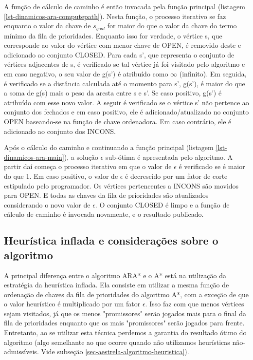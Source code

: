 A função de cálculo de caminho é então invocada pela função principal (listagem \ref{lst-dinamicos-ara-computepath}). Nesta função, o processo iterativo se faz enquanto o valor da chave de $s_{goal}$ for maior do que o valor da chave do termo mínimo da fila de prioridades. Enquanto isso for verdade, o vértice s, que corresponde ao valor do vértice com menor chave de OPEN, é removido deste e adicionado ao conjunto CLOSED. Para cada s', que representa o conjunto de vértices adjacentes de s, é verificado se tal vértice já foi visitado pelo algoritmo e em caso negativo, o seu valor de g(s') é atribuído como $\infty$ (infinito). Em seguida, é verificado se a distância calculada até o momento para s', g(s'), é maior do que a soma de g(s) mais o peso da aresta entre s e s'. Se caso positivo, g(s') é atribuído com esse novo valor. A seguir é verificado se o vértice s' não pertence ao conjunto dos fechados e em caso positivo, ele é adicionado/atualizado no conjunto OPEN baseando-se na função de chave ordenadora. Em caso contrário, ele é adicionado ao conjunto dos INCONS.

Após o cálculo do caminho e continuando a função principal (listagem \ref{lst-dinamicos-ara-main}), a solução $\epsilon$ sub-ótima é apresentada pelo algoritmo. A partir daí começa o processo iterativo em que o valor de $\epsilon$ é verificado se é maior do que 1. Em caso positivo, o valor de $\epsilon$ é decrescido por um fator de corte estipulado pelo programador. Os vértices pertencentes a INCONS são movidos para OPEN. E todas as chaves da fila de prioridades são atualizados considerando o novo valor de $\epsilon$. O conjunto CLOSED é limpo e a função de cálculo de caminho é invocada novamente, e  o resultado publicado.

\subsection{Heurística inflada e considerações sobre o algoritmo}
\label{sec-dinamicos-ad-consideracoes}

A principal diferença entre o algoritmo ARA* e o A* está na utilização da estratégia da heurística inflada. Ela consiste em utilizar a mesma função de ordenação de chaves da fila de prioridades do algoritmo A*, com a exceção de que o valor heurístico é multiplicado por um fator $\epsilon$. Isso faz com que menos vértices sejam visitados, já que os menos "promissores" serão jogados mais para o final da fila de prioridades enquanto que os mais "promissores" serão jogados para frente. Entretanto, ao se utilizar esta técnica perdemos a garantia do resultado ótimo do algoritmo (algo semelhante ao que ocorre quando não utilizamos heurísticas não-admissíveis. Vide subseção \ref{sec-aestrela-algoritmo-heuristica}).

